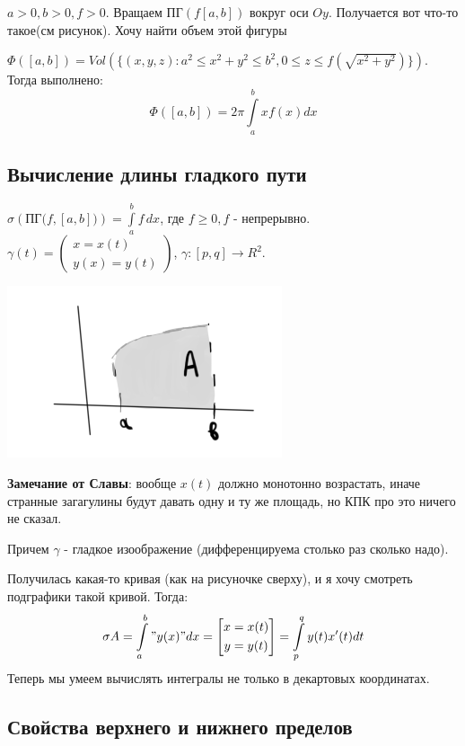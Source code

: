 \documentclass{article}
\newcommand{\integral}[2]{\displaystyle\int\limits_{#1}^{#2}}
\begin{document}
$a>0,b>0, f>0$. Вращаем ПГ$(f[a,b])$ вокруг оси $Oy$. Получается вот что-то такое(см рисунок). Хочу найти объем этой фигуры 

$\varPhi([a,b]) = Vol(\{(x,y,z): a^2\leq x^2 + y^2 \leq b^2, 0\leq z \leq f(\sqrt{x^2+y^2})\})$. Тогда выполнено:
$$\varPhi([a,b]) = 2\pi \integral{a}{b}xf(x)dx$$

\subsection{Вычисление длины гладкого пути}

$\sigma (\text{ПГ($f, [a,b]$)}) = \integral{a}{b}f\, dx$, где $f \geq 0, f$ - непрерывно.
$\gamma(t) =  \left (\begin{gathered}
    x = x(t)\\
    y(x) = y(t)
\end{gathered}\right)$, $\gamma:[p,q] \rightarrow R^2$.
\begin{center}
   \includegraphics[width = 7 cm]{assets/integral_4.png}
\end{center}
\textbf{Замечание от Славы}: вообще $x(t)$ должно монотонно возрастать, иначе странные загагулины будут давать одну и ту же площадь, но КПК про это ничего не сказал.

Причем $\gamma$ -  гладкое изоображение (дифференцируема столько раз сколько надо).

Получилась какая-то кривая (как на рисуночке сверху), и я хочу смотреть подграфики такой кривой. Тогда:
$$\sigma A = \integral{a}{b}"y(x)"dx = \left[\begin{gathered}
    x = x(t)\\
    y = y(t)
\end{gathered}\right] = \integral{p}{q}y(t) x'(t) dt$$
Теперь мы умеем вычислять интегралы не только в декартовых координатах.


\subsection{Свойства верхнего и нижнего пределов}
\end{document}

